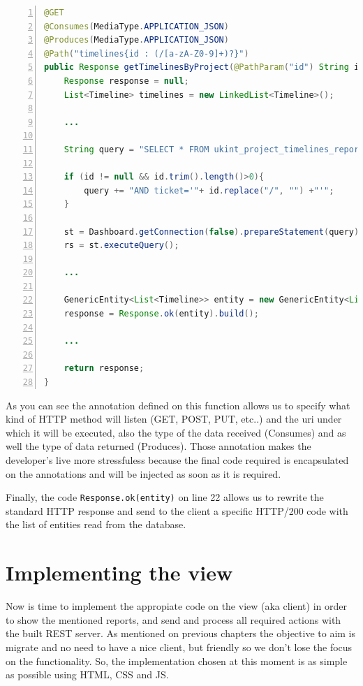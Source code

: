 \begin{lstlisting}[language=Java,breaklines=true,caption=Reports.getTimelinesByProjects(),label=f_migration_gettimelines,frame=single,captionpos=b,numbers=left,
] @GET
@Consumes(MediaType.APPLICATION_JSON)
@Produces(MediaType.APPLICATION_JSON)
@Path("timelines{id : (/[a-zA-Z0-9]+)?}")
public Response getTimelinesByProject(@PathParam("id") String id) {
	Response response = null;
	List<Timeline> timelines = new LinkedList<Timeline>(); 

	...
	
	String query = "SELECT * FROM ukint_project_timelines_reports WHERE 1 ";

	if (id != null && id.trim().length()>0){
		query += "AND ticket='"+ id.replace("/", "") +"'";
	}
	
	st = Dashboard.getConnection(false).prepareStatement(query);
	rs = st.executeQuery();
	
	...
	
	GenericEntity<List<Timeline>> entity = new GenericEntity<List<Timeline>>(timelines) {};
	response = Response.ok(entity).build();
	
	...
	
	return response;
}
\end{lstlisting}

As you can see the annotation defined on this function allows us to specify what
kind of HTTP method will listen (GET, POST, PUT, etc..) and the uri under which
it will be executed, also the type of the data received (Consumes) and as well
the type of data returned (Produces). Those annotation makes the developer's
live more stressfuless because the final code required is encapsulated on the
annotations and will be injected as soon as it is required.

Finally, the code \texttt{Response.ok(entity)} on line 22 allows us to rewrite
the standard HTTP response and send to the client a specific HTTP/200 code with the
list of entities read from the database.

\section{Implementing the view}
Now is time to implement the appropiate code on the view (aka client) in order
to show the mentioned reports, and send and process all required actions with
the built REST server. As mentioned on previous chapters the objective to aim is
migrate and no need to have a nice client, but friendly so we don't
lose the focus on the functionality. So, the implementation chosen at this
moment is as simple as possible using HTML, CSS and JS.

